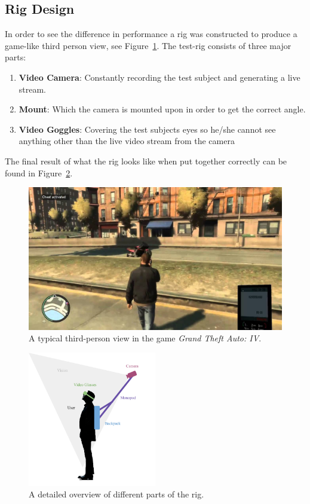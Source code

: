 \documentclass[runningheads,a4paper,oribibl]{llncs}
\begin{document}
\subsection{Rig Design}
In order to see the difference in performance a rig was constructed to produce a game-like third person view, see Figure~\ref{fig:GTAIV}. The test-rig consists of three major parts:
\begin{enumerate}
	\item \textbf{Video Camera}: Constantly recording the test subject and generating a live stream.
	\item \textbf{Mount}: Which the camera is mounted upon in order to get the correct angle.
	\item \textbf{Video Goggles}: Covering the test subjects eyes so he/she cannot see anything other than the live video stream from the camera
\end{enumerate}
The final result of what the rig looks like when put together correctly can be found in Figure~\ref{fig:RigDesign}.

\begin{figure}
   \centering
   \includegraphics[width=\textwidth]{GTA}
   \caption{A typical third-person view in the game \emph{Grand Theft Auto: IV}. \label{fig:GTAIV}}
\end{figure}

\begin{figure}
   \centering
   \includegraphics[width=0.5\textwidth]{Rig}
   \caption{A detailed overview of different parts of the rig. \label{fig:RigDesign}}
\end{figure}
\end{document}
